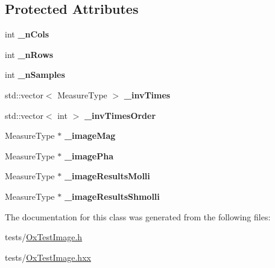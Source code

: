 \subsection*{Protected Attributes}
\begin{DoxyCompactItemize}
\item 
int {\bfseries \+\_\+n\+Cols}\hypertarget{class_ox_1_1_test_image_aede6d17394f5b1d7aee6287c17482bed}{}\label{class_ox_1_1_test_image_aede6d17394f5b1d7aee6287c17482bed}

\item 
int {\bfseries \+\_\+n\+Rows}\hypertarget{class_ox_1_1_test_image_a2fca989633ec429545fefe579641eeb3}{}\label{class_ox_1_1_test_image_a2fca989633ec429545fefe579641eeb3}

\item 
int {\bfseries \+\_\+n\+Samples}\hypertarget{class_ox_1_1_test_image_a0b2de27b3ba5865c071a754c34e86bc7}{}\label{class_ox_1_1_test_image_a0b2de27b3ba5865c071a754c34e86bc7}

\item 
std\+::vector$<$ Measure\+Type $>$ {\bfseries \+\_\+inv\+Times}\hypertarget{class_ox_1_1_test_image_a9a3283dccb1476d113836134c3479328}{}\label{class_ox_1_1_test_image_a9a3283dccb1476d113836134c3479328}

\item 
std\+::vector$<$ int $>$ {\bfseries \+\_\+inv\+Times\+Order}\hypertarget{class_ox_1_1_test_image_aa7d94bb56b584ccae5619fcf5e55218c}{}\label{class_ox_1_1_test_image_aa7d94bb56b584ccae5619fcf5e55218c}

\item 
Measure\+Type $\ast$ {\bfseries \+\_\+image\+Mag}\hypertarget{class_ox_1_1_test_image_aa6d8862446566b0f1bc313de05cedd28}{}\label{class_ox_1_1_test_image_aa6d8862446566b0f1bc313de05cedd28}

\item 
Measure\+Type $\ast$ {\bfseries \+\_\+image\+Pha}\hypertarget{class_ox_1_1_test_image_a108ccefc1c986d4ad3265ec5601841c5}{}\label{class_ox_1_1_test_image_a108ccefc1c986d4ad3265ec5601841c5}

\item 
Measure\+Type $\ast$ {\bfseries \+\_\+image\+Results\+Molli}\hypertarget{class_ox_1_1_test_image_aa942d21740af38bc720db46a77fcea6c}{}\label{class_ox_1_1_test_image_aa942d21740af38bc720db46a77fcea6c}

\item 
Measure\+Type $\ast$ {\bfseries \+\_\+image\+Results\+Shmolli}\hypertarget{class_ox_1_1_test_image_abab3b898dade1792c251df511357be13}{}\label{class_ox_1_1_test_image_abab3b898dade1792c251df511357be13}

\end{DoxyCompactItemize}


The documentation for this class was generated from the following files\+:\begin{DoxyCompactItemize}
\item 
tests/\hyperlink{_ox_test_image_8h}{Ox\+Test\+Image.\+h}\item 
tests/\hyperlink{_ox_test_image_8hxx}{Ox\+Test\+Image.\+hxx}\end{DoxyCompactItemize}
